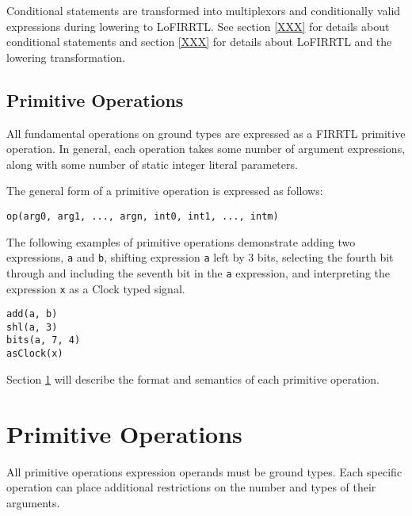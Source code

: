 \documentclass[12pt]{article}
\begin{document}
Conditional statements are transformed into multiplexors and conditionally valid expressions during lowering to LoFIRRTL. See section \ref{XXX} for details about conditional statements and section \ref{XXX} for details about LoFIRRTL and the lowering transformation.

\subsection{Primitive Operations}

All fundamental operations on ground types are expressed as a FIRRTL primitive operation. In general, each operation takes some number of argument expressions, along with some number of static integer literal parameters. 

The general form of a primitive operation is expressed as follows:
\begin{verbatim}
op(arg0, arg1, ..., argn, int0, int1, ..., intm)
\end{verbatim}

The following examples of primitive operations demonstrate adding two expressions, \verb|a| and \verb|b|, shifting expression \verb|a| left by 3 bits, selecting the fourth bit through and including the seventh bit in the \verb|a| expression, and interpreting the expression \verb|x| as a Clock typed signal.
\begin{verbatim}
add(a, b)
shl(a, 3)
bits(a, 7, 4)
asClock(x)
\end{verbatim}

Section \ref{primitives} will describe the format and semantics of each primitive operation.

\section{Primitive Operations} \label{primitives}

\newcommand{\vv}[1]{{\ttfamily #1}}
\newcommand{\ts}[1]{\textsubscript{#1}}
\newcommand{\nf}[1]{\normalfont{\textbf{#1}}}
\newcommand{\opheader}{
 \hline
    \multicolumn{1}{|c|}{\nf{Name}} 
  & \multicolumn{1}{c|}{\nf{Arguments}}
  & \multicolumn{1}{c|}{\nf{Parameters}}
  & \multicolumn{1}{c|}{\nf{Arg Types}}
  & \multicolumn{1}{c|}{\nf{Result Type}}
  & \multicolumn{1}{c|}{\nf{Result Width}}\\
\hline  
}


All primitive operations expression operands must be ground types. Each specific operation can place additional restrictions on the number and types of their arguments.
\end{document}

